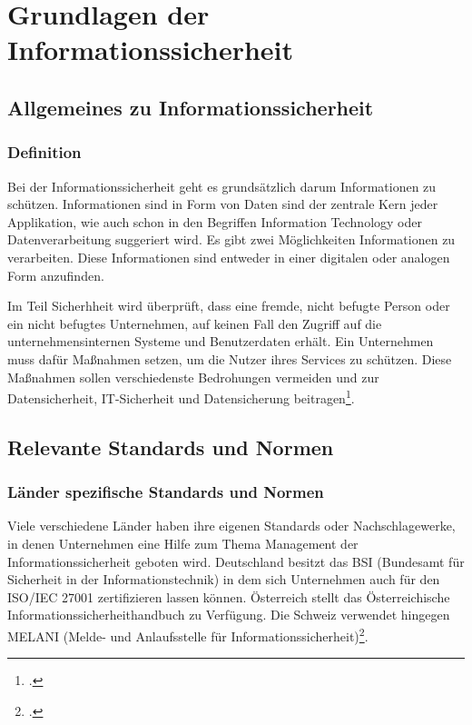 \chapter{Grundlagen der Informationssicherheit}
\strahlhofer

\section{Allgemeines zu Informationssicherheit} 
\subsection{Definition}
Bei der Informationssicherheit geht es grundsätzlich darum Informationen zu schützen. Informationen sind in Form von Daten sind der zentrale Kern jeder Applikation, wie auch schon in den Begriffen Information Technology oder Datenverarbeitung suggeriert wird. Es gibt zwei Möglichkeiten Informationen zu verarbeiten. Diese Informationen sind entweder in einer digitalen oder analogen Form anzufinden.

Im Teil Sicherhheit wird überprüft, dass eine fremde, nicht befugte Person oder ein nicht befugtes Unternehmen, auf keinen Fall den Zugriff auf die unternehmensinternen Systeme und Benutzerdaten erhält. Ein Unternehmen muss dafür Maßnahmen setzen, um die Nutzer ihres Services zu schützen. Diese Maßnahmen sollen verschiedenste Bedrohungen vermeiden und zur Datensicherheit, IT-Sicherheit und Datensicherung beitragen\footcite{Lehrunterlagen-HTL-cloud}.


\section{Relevante Standards und Normen}
\subsection{Länder spezifische Standards und Normen}
Viele verschiedene Länder haben ihre eigenen Standards oder Nachschlagewerke, in denen Unternehmen eine Hilfe zum Thema Management der Informationssicherheit geboten wird.
Deutschland besitzt das BSI (Bundesamt für Sicherheit in der Informationstechnik) in dem sich Unternehmen auch für den ISO/IEC 27001 zertifizieren lassen können. Österreich stellt das Österreichische Informationssicherheithandbuch zu Verfügung. Die Schweiz verwendet hingegen MELANI (Melde- und Anlaufsstelle für Informationssicherheit)\footcite{Lehrunterlagen-HTL-cloud}.


